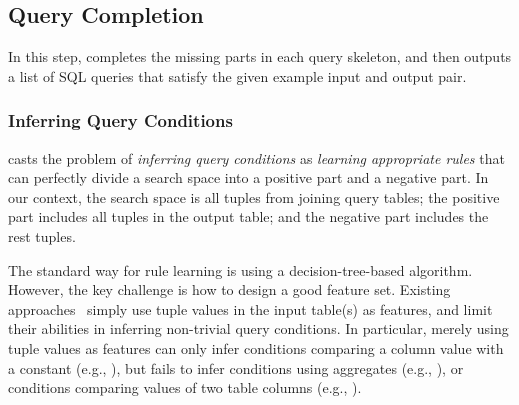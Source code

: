 

\subsection{Query Completion}
\label{sec:completion}

\enlargethispage{5pt}
\vspace{-1mm}

In this step, \ourtool completes the missing parts
in each query skeleton, and then
outputs a list of SQL queries
that satisfy the given example input and output pair.




\subsubsection{Inferring Query Conditions}
\label{sec:condition}

\ourtool casts the problem of \textit{inferring query conditions} as
 \textit{learning appropriate rules} that can perfectly divide a search space
into a positive part and a negative part. In our context, the search space
is all tuples from joining query tables; the positive part
includes all tuples in the output table; and the negative part includes the rest
tuples.

The standard way for rule learning is using a decision-tree-based
algorithm. However, the key challenge is how to design a good feature set.
Existing approaches~\cite{Tran:2009} simply use
tuple values in the input table(s) as features, 
and limit their abilities in inferring non-trivial
query conditions. In particular,
merely using tuple values as features can only infer
conditions comparing a column value with a constant
(e.g., ), but
fails to infer conditions using aggregates (e.g., ),
or conditions comparing values of two table columns
(e.g., ).


